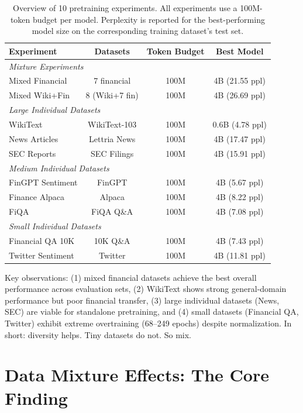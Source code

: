 \begin{table}[h]
\centering
\small
\begin{tabular}{lccc}
\toprule
\textbf{Experiment} & \textbf{Datasets} & \textbf{Token Budget} & \textbf{Best Model} \\
\midrule
\multicolumn{4}{l}{\textit{Mixture Experiments}} \\
Mixed Financial & 7 financial & 100M & 4B (21.55 ppl) \\
Mixed Wiki+Fin & 8 (Wiki+7 fin) & 100M & 4B (26.69 ppl) \\
\midrule
\multicolumn{4}{l}{\textit{Large Individual Datasets}} \\
WikiText & WikiText-103 & 100M & 0.6B (4.78 ppl) \\
News Articles & Lettria News & 100M & 4B (17.47 ppl) \\
SEC Reports & SEC Filings & 100M & 4B (15.91 ppl) \\
\midrule
\multicolumn{4}{l}{\textit{Medium Individual Datasets}} \\
FinGPT Sentiment & FinGPT & 100M & 4B (5.67 ppl) \\
Finance Alpaca & Alpaca & 100M & 4B (8.22 ppl) \\
FiQA & FiQA Q\&A & 100M & 4B (7.08 ppl) \\
\midrule
\multicolumn{4}{l}{\textit{Small Individual Datasets}} \\
Financial QA 10K & 10K Q\&A & 100M & 4B (7.43 ppl) \\
Twitter Sentiment & Twitter & 100M & 4B (11.81 ppl) \\
\bottomrule
\end{tabular}
\caption[Overview of Pretraining Experiments]{Overview of 10 pretraining experiments. All experiments use a 100M-token budget per model. Perplexity is reported for the best-performing model size on the corresponding training dataset's test set.}
\label{tab:experiments_overview}
\end{table}

Key observations: (1) mixed financial datasets achieve the best overall performance across evaluation sets, (2) WikiText shows strong general‑domain performance but poor financial transfer, (3) large individual datasets (News, SEC) are viable for standalone pretraining, and (4) small datasets (Financial QA, Twitter) exhibit extreme overtraining (68–249 epochs) despite normalization. In short: diversity helps. Tiny datasets do not. So mix.

\section{Data Mixture Effects: The Core Finding}

